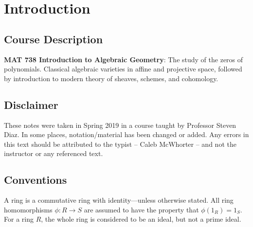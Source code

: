 \newpage
\section{Introduction}
\subsection{Course Description}

\textbf{MAT 738  Introduction to Algebraic Geometry}: The study of the zeros of polynomials. Classical algebraic varieties in affine and projective space, followed by introduction to modern theory of sheaves, schemes, and cohomology.


\subsection{Disclaimer}

These notes were taken in Spring 2019 in a course taught by Professor Steven Diaz. In some places, notation/material has been changed or added. Any errors in this text should be attributed to the typist -- Caleb McWhorter -- and not the instructor or any referenced text. 


\subsection{Conventions}

A ring is a commutative ring with identity---unless otherwise stated. All ring homomorphisms $\phi: R \to S$ are assumed to have the property that $\phi(1_R)=1_S$. For a ring $R$, the whole ring is considered to be an ideal, but not a prime ideal. 
































